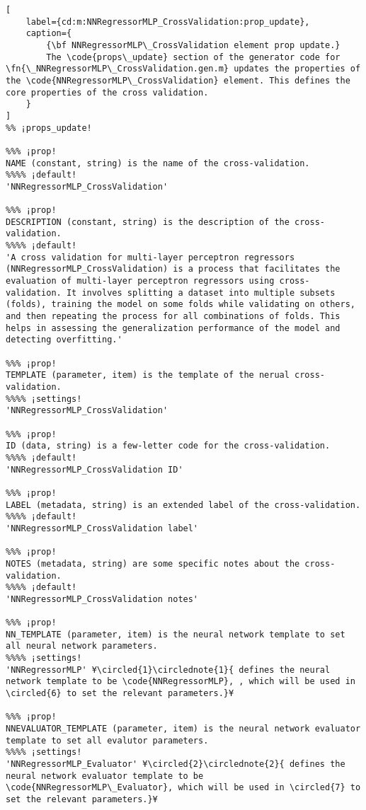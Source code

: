 \documentclass{tufte-handout}
\begin{document}
\begin{lstlisting}[
	label={cd:m:NNRegressorMLP_CrossValidation:prop_update},
	caption={
		{\bf NNRegressorMLP\_CrossValidation element prop update.}
		The \code{props\_update} section of the generator code for \fn{\_NNRegressorMLP\_CrossValidation.gen.m} updates the properties of the \code{NNRegressorMLP\_CrossValidation} element. This defines the core properties of the cross validation.
	}
]
%% ¡props_update!

%%% ¡prop!
NAME (constant, string) is the name of the cross-validation.
%%%% ¡default!
'NNRegressorMLP_CrossValidation'

%%% ¡prop!
DESCRIPTION (constant, string) is the description of the cross-validation.
%%%% ¡default!
'A cross validation for multi-layer perceptron regressors (NNRegressorMLP_CrossValidation) is a process that facilitates the evaluation of multi-layer perceptron regressors using cross-validation. It involves splitting a dataset into multiple subsets (folds), training the model on some folds while validating on others, and then repeating the process for all combinations of folds. This helps in assessing the generalization performance of the model and detecting overfitting.'

%%% ¡prop!
TEMPLATE (parameter, item) is the template of the nerual cross-validation.
%%%% ¡settings!
'NNRegressorMLP_CrossValidation'

%%% ¡prop!
ID (data, string) is a few-letter code for the cross-validation.
%%%% ¡default!
'NNRegressorMLP_CrossValidation ID'

%%% ¡prop!
LABEL (metadata, string) is an extended label of the cross-validation.
%%%% ¡default!
'NNRegressorMLP_CrossValidation label'

%%% ¡prop!
NOTES (metadata, string) are some specific notes about the cross-validation.
%%%% ¡default!
'NNRegressorMLP_CrossValidation notes'

%%% ¡prop!
NN_TEMPLATE (parameter, item) is the neural network template to set all neural network parameters.
%%%% ¡settings!
'NNRegressorMLP' ¥\circled{1}\circlednote{1}{ defines the neural network template to be \code{NNRegressorMLP}, , which will be used in \circled{6} to set the relevant parameters.}¥

%%% ¡prop!
NNEVALUATOR_TEMPLATE (parameter, item) is the neural network evaluator template to set all evalutor parameters.
%%%% ¡settings!
'NNRegressorMLP_Evaluator' ¥\circled{2}\circlednote{2}{ defines the neural network evaluator template to be \code{NNRegressorMLP\_Evaluator}, which will be used in \circled{7} to set the relevant parameters.}¥ 


\end{lstlisting}
\end{document}
